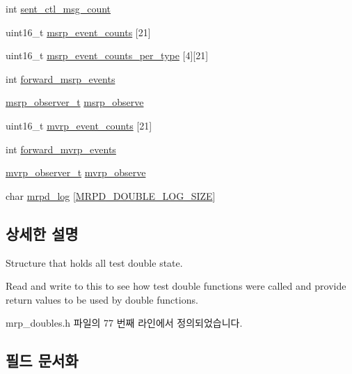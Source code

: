 \begin{DoxyCompactItemize}
int \hyperlink{structmrpd__test__state_a22276d4ca2a7dc05332e212db7f2134e}{sent\+\_\+ctl\+\_\+msg\+\_\+count}
\item 
uint16\+\_\+t \hyperlink{structmrpd__test__state_a023271ecbc0b1e5150fa848b509d35ca}{msrp\+\_\+event\+\_\+counts} \mbox{[}21\mbox{]}
\item 
uint16\+\_\+t \hyperlink{structmrpd__test__state_a0765cf7ca7b4f9fc52ddcfd9730a34da}{msrp\+\_\+event\+\_\+counts\+\_\+per\+\_\+type} \mbox{[}4\mbox{]}\mbox{[}21\mbox{]}
\item 
int \hyperlink{structmrpd__test__state_a2071b97373847fe6c7ffadbd4a19cdf1}{forward\+\_\+msrp\+\_\+events}
\item 
\hyperlink{mrp__doubles_8h_ab39e90f9b063bf13ca9aa9e83486cbe3}{msrp\+\_\+observer\+\_\+t} \hyperlink{structmrpd__test__state_aee209b89e16f5f552ac075ca9a193fa2}{msrp\+\_\+observe}
\item 
uint16\+\_\+t \hyperlink{structmrpd__test__state_a0f19262f63fefe73812befa42cf682c5}{mvrp\+\_\+event\+\_\+counts} \mbox{[}21\mbox{]}
\item 
int \hyperlink{structmrpd__test__state_a3d733b955e546c6b00da196f0035a09b}{forward\+\_\+mvrp\+\_\+events}
\item 
\hyperlink{mrp__doubles_8h_aaeed52100ab126cb2cb5db8748e3601a}{mvrp\+\_\+observer\+\_\+t} \hyperlink{structmrpd__test__state_ab052dd0ec39256df9a7f8903ed943c56}{mvrp\+\_\+observe}
\item 
char \hyperlink{structmrpd__test__state_a601b9db3c0b4a7a3ab243f0943054263}{mrpd\+\_\+log} \mbox{[}\hyperlink{mrp__doubles_8h_a514eb93c70b79e2955185b7225051ac9}{M\+R\+P\+D\+\_\+\+D\+O\+U\+B\+L\+E\+\_\+\+L\+O\+G\+\_\+\+S\+I\+ZE}\mbox{]}
\end{DoxyCompactItemize}


\subsection{상세한 설명}
Structure that holds all test double state.

Read and write to this to see how test double functions were called and provide return values to be used by double functions. 

mrp\+\_\+doubles.\+h 파일의 77 번째 라인에서 정의되었습니다.



\subsection{필드 문서화}
